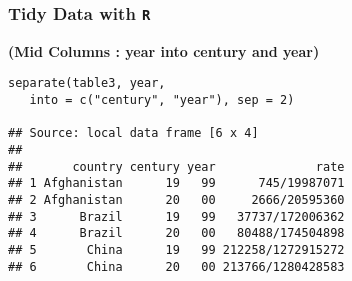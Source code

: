 \documentclass[TIDYMASTER.tex]{subfiles}
\begin{document}
\begin{frame}[fragile]
\frametitle{Tidy Data with \texttt{R}}
\large
\textbf{(Mid Columns : year into century and year)}
\begin{verbatim}
separate(table3, year, 
   into = c("century", "year"), sep = 2)

## Source: local data frame [6 x 4]
## 
##       country century year              rate
## 1 Afghanistan      19   99      745/19987071
## 2 Afghanistan      20   00     2666/20595360
## 3      Brazil      19   99   37737/172006362
## 4      Brazil      20   00   80488/174504898
## 5       China      19   99 212258/1272915272
## 6       China      20   00 213766/1280428583
\end{verbatim}


\end{frame}
%
%
%
%
\end{document}
